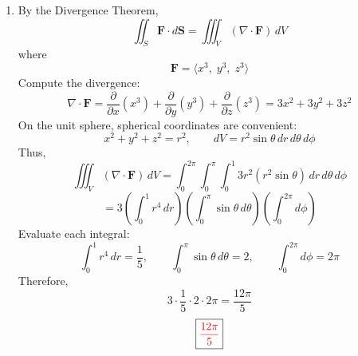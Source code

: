 \begin{enumerate}
    \item By the Divergence Theorem,
          \[
              \iint_S \mathbf{F}\cdot d\mathbf{S}
              =
              \iiint_V (\nabla\cdot \mathbf{F})\,dV
          \]
          where
          \[
              \mathbf{F}=\langle x^3,\; y^3,\; z^3\rangle
          \]
          Compute the divergence:
          \[
              \nabla\cdot \mathbf{F}
              =
              \frac{\partial}{\partial x}(x^3)+\frac{\partial}{\partial y}(y^3)+\frac{\partial}{\partial z}(z^3)
              =3x^2+3y^2+3z^2
          \]
          On the unit sphere, spherical coordinates are convenient:
          \[
              x^2+y^2+z^2=r^2,\qquad dV=r^2\sin\theta\,dr\,d\theta\,d\phi
          \]
          Thus,
          \[
              \iiint_V (\nabla\cdot \mathbf{F})\,dV
              =
              \int_0^{2\pi}\int_0^\pi\int_0^1 3r^2(r^2\sin\theta)\,dr\,d\theta\,d\phi
          \]
          \[
              =
              3\left(\int_0^1 r^4\,dr\right)
              \left(\int_0^\pi \sin\theta\,d\theta\right)
              \left(\int_0^{2\pi} d\phi\right)
          \]
          Evaluate each integral:
          \[
              \int_0^1 r^4\,dr=\frac15,\qquad
              \int_0^\pi \sin\theta\,d\theta=2,\qquad
              \int_0^{2\pi} d\phi=2\pi
          \]
          Therefore,
          \[
              3\cdot \frac15\cdot 2\cdot 2\pi
              =\frac{12\pi}{5}
          \]
          \[
              \boxed{\textcolor{red}{\frac{12\pi}{5}}}
          \]
\end{enumerate}